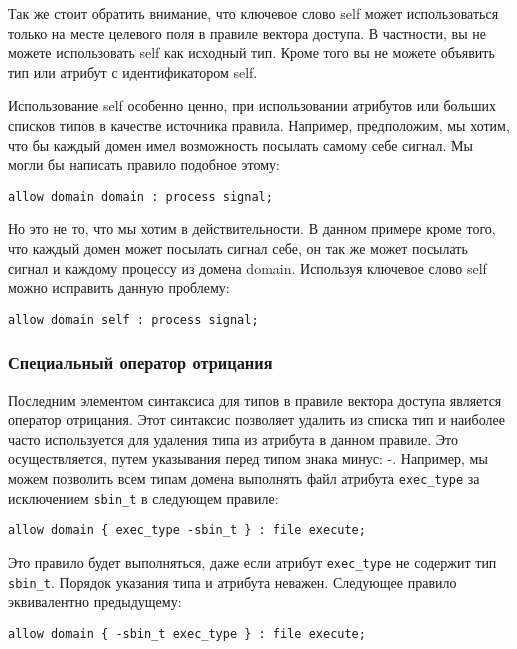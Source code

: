 \documentclass{./../class/UIR}
\begin{document}
    Так же стоит обратить внимание, что ключевое слово self может использоваться
    только на месте целевого поля в правиле вектора доступа. В частности, вы не
    можете использовать self как исходный тип.  Кроме того вы не можете объявить
    тип или атрибут с идентификатором self.

    Использование self особенно ценно, при использовании атрибутов или больших
    списков типов в качестве источника правила. Например, предположим, мы хотим,
    что бы каждый домен имел возможность посылать самому себе сигнал. Мы могли
    бы написать правило подобное этому:
\begin{verbatim}
allow domain domain : process signal;
\end{verbatim}
    Но это не то, что мы хотим в действительности. В данном примере кроме того,
    что каждый домен может посылать сигнал себе, он так же может посылать сигнал
    и каждому процессу из домена domain. Используя ключевое слово self можно
    исправить данную проблему:
\begin{verbatim}
allow domain self : process signal;
\end{verbatim}
\subsubsection{Специальный оператор отрицания}
    Последним элементом синтаксиса для типов в правиле вектора доступа является
    оператор отрицания. Этот синтаксис позволяет удалить из списка тип и
    наиболее часто используется для удаления типа из атрибута в данном правиле.
    Это осуществляется, путем указывания перед типом знака минус: -. Например,
    мы можем позволить всем типам домена выполнять файл атрибута
    \verb"exec_type" за исключением \verb"sbin_t" в следующем правиле:
\begin{verbatim}
allow domain { exec_type -sbin_t } : file execute;
\end{verbatim}
    Это правило будет выполняться, даже если атрибут \verb"exec_type" не
    содержит тип \verb"sbin_t".
    Порядок указания типа и атрибута неважен. Следующее правило эквивалентно
    предыдущему:
\begin{verbatim}
allow domain { -sbin_t exec_type } : file execute;
\end{verbatim}
\end{document}

